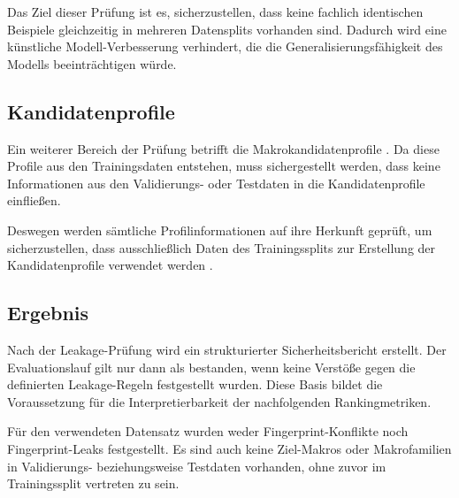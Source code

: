 Das Ziel dieser Prüfung ist es, sicherzustellen, dass keine fachlich identischen Beispiele gleichzeitig in mehreren Datensplits vorhanden sind. Dadurch wird eine künstliche Modell-Verbesserung verhindert,
die die Generalisierungsfähigkeit des Modells beeinträchtigen würde.

\subsection{Kandidatenprofile}

Ein weiterer Bereich der Prüfung betrifft die Makrokandidatenprofile \parencite{EPLAN-Makros}.
Da diese Profile aus den Trainingsdaten entstehen, muss sichergestellt werden, dass keine Informationen aus den Validierungs- oder Testdaten in die Kandidatenprofile einfließen.

Deswegen werden sämtliche Profilinformationen auf ihre Herkunft geprüft, um sicherzustellen, dass ausschließlich Daten des Trainingssplits zur Erstellung der Kandidatenprofile verwendet werden \parencite{srcLeakageGuard}.

\subsection{Ergebnis}

Nach der Leakage-Prüfung wird ein strukturierter Sicherheitsbericht erstellt. Der Evaluationslauf gilt nur dann als bestanden, wenn keine Verstöße gegen die definierten Leakage-Regeln festgestellt wurden.
Diese Basis bildet die Voraussetzung für die Interpretierbarkeit der nachfolgenden Rankingmetriken.

Für den verwendeten Datensatz wurden weder Fingerprint-Konflikte noch Fingerprint-Leaks festgestellt. 
Es sind auch keine Ziel-Makros \parencite{EPLAN-Makros} oder Makrofamilien in Validierungs- beziehungsweise Testdaten vorhanden, ohne zuvor im Trainingssplit vertreten zu sein. 